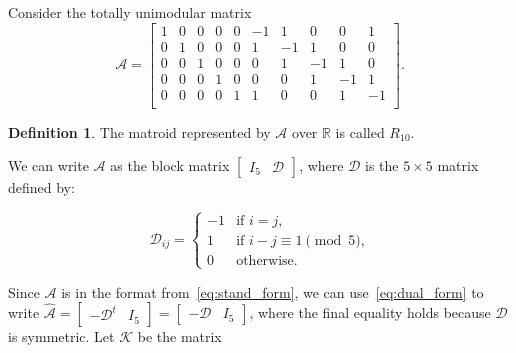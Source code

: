 \documentclass[12p]{amsart}
\numberwithin{equation}{section}
\theoremstyle{plain}
\theoremstyle{definition}
\newtheorem{defn}[thm]{Definition}
\begin{document}
Consider the totally unimodular matrix
\begin{equation}\label{eq:R10}\mathcal A = \begin{bmatrix}
    1 & 0 & 0 & 0 & 0 &   -1 & 1 & 0 & 0 & 1\\
    0 & 1 & 0 & 0 & 0 &   1 & -1 & 1 & 0 & 0\\
    0 & 0 & 1 & 0 & 0 &   0 & 1 & -1 & 1 & 0\\
    0 & 0 & 0 & 1 & 0 &   0 & 0 & 1 & -1 & 1\\
    0 & 0 & 0 & 0 & 1 &   1 & 0 & 0 & 1 & -1\\
\end{bmatrix}.\end{equation}

\begin{defn}\label{def:R10}
    The matroid represented by $\mathcal A$ over $\mathbb R$ is called $R_{10}$. 
\end{defn}

We can write $\mathcal A$ as the block matrix $\begin{bmatrix} I_5 & \mathcal D \end{bmatrix}$, where $\mathcal D$ is the $5 \times 5$ matrix defined by:

\[\mathcal D_{ij} = \begin{cases} - 1 & \text{if $i=j$,}\\
1 &\text{if $i-j \equiv 1\pmod 5$,}\\
0 & \text{otherwise.}\end{cases}\]

Since $\mathcal A$ is in the format from~\eqref{eq:stand_form}, we can use~\eqref{eq:dual_form} to write $\widehat{\mathcal A} = \begin{bmatrix} -\mathcal D^t & I_5 \end{bmatrix} = \begin{bmatrix} -\mathcal D & I_5 \end{bmatrix}$, where the final equality holds because $\mathcal D$ is symmetric. Let $\mathcal K$ be the matrix 
\end{document}
